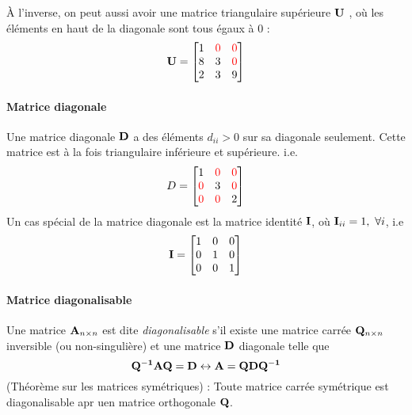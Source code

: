 \documentclass[12pt, french]{report}
\begin{document}
À l'inverse, on peut aussi avoir une matrice triangulaire supérieure $\mathbf{U}$ , où les éléments en haut de la diagonale sont tous égaux à 0 : 
\begin{align*}
\mathbf{U} = 
\begin{bmatrix}
1     & \textcolor{red}{0}    &  \textcolor{red}{0}   \\
8     & 3   & \textcolor{red}{0} \\
2   & 3   & 9 \\
\end{bmatrix}
\end{align*}

\paragraph{Matrice diagonale} Une matrice diagonale $\mathbf{D}$ a des éléments $d_{ii} > 0$ sur sa diagonale seulement. Cette matrice est à la fois triangulaire inférieure et supérieure. i.e.
\begin{align*}
D = 
\begin{bmatrix}
1     & \textcolor{red}{0}    &  \textcolor{red}{0}   \\
\textcolor{red}{0}     & 3   & \textcolor{red}{0} \\
\textcolor{red}{0}   & \textcolor{red}{0}   & 2 \\
\end{bmatrix}
\end{align*}
Un cas spécial de la matrice diagonale est la matrice identité $\mathbf{I}$, où $\mathbf{I}_{ii} = 1 ,\ \forall i$, i.e
\begin{equation}
\label{eq:matrice-identite}
\mathbf{I} = 
\begin{bmatrix}
1     & 0    &  0   \\
0     & 1   & 0 \\
0   & 0   & 1 \\
\end{bmatrix}
\end{equation}


\paragraph{Matrice diagonalisable} Une matrice $\mathbf{A}_{n\times n}$ est dite \textit{diagonalisable} s'il existe une matrice carrée $\mathbf{Q}_{n \times n}$ inversible (ou non-singulière) et une matrice $\mathbf{D}$ diagonale telle que
\begin{equation}
\label{eq:matrice-diagonalisable}
\mathbf{Q^{-1} A Q = D} \leftrightarrow \mathbf{A = Q D Q^{-1}}
\end{equation}
(Théorème sur les matrices symétriques) : Toute matrice carrée symétrique est diagonalisable apr uen matrice orthogonale $\mathbf{Q}$.
\end{document}
